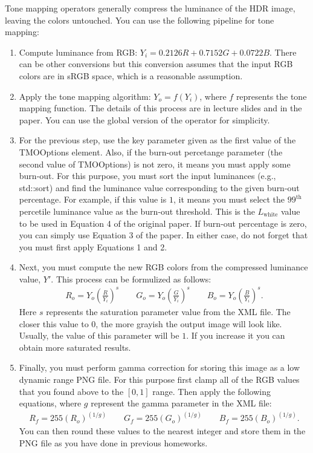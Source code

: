 \documentclass[12pt]{article}
\begin{document}
Tone mapping operators generally compress the luminance of the HDR
image, leaving the colors untouched. You can use the following pipeline
for tone mapping:

\begin{enumerate}
\item Compute luminance from RGB: $Y_i = 0.2126R + 0.7152G + 0.0722B$.
There can be other conversions but this conversion assumes that the
input RGB colors are in sRGB space, which is a reasonable assumption.
\item Apply the tone mapping algorithm: $Y_o = f(Y_i)$, where $f$
represents the tone mapping function. The details of this process are in
lecture slides and in the paper. You can use the global version of the
operator for simplicity.
\item For the previous step, use the key parameter given as the first
value of the TMOOptions element. Also, if the burn-out percetange
parameter (the second value of TMOOptions) is not zero, it means you 
must apply some burn-out. For this purpose, you must sort the input
luminances (e.g., std::sort) and find the luminance value corresponding
to the given burn-out percentage. For example, if this value is $1$, it
means you must select the $99^\mathrm{th}$ percetile luminance value as
the burn-out threshold. This is the $L_\mathrm{white}$ value to be used
in Equation 4 of the original paper. If burn-out percentage is zero, you
can simply use Equation 3 of the paper. In either case, do not forget
that you must first apply Equations 1 and 2.
\item Next, you must compute the new RGB colors from the compressed
luminance value, $Y'$. This process can be formulized as follows:
%
\begin{align}
R_o = Y_o\left(\frac{R}{Y_i}\right)^s \qquad G_o =
Y_o\left(\frac{G}{Y_i}\right)^s \qquad B_o = Y_o\left(\frac{B}{Y_i}\right)^s. 
\end{align}
%
Here $s$ represents the saturation parameter value from the XML file.
The closer this value to $0$, the more grayish the output image will
look like. Usually, the value of this parameter will be $1$. If you
increase it you can obtain more saturated results.
\item Finally, you must perform gamma correction for storing this image
as a low dynamic range PNG file. For this purpose first clamp all of the
RGB values that you found above to the $[0, 1]$ range. Then apply the
following equations, where $g$ represent the gamma parameter in the XML
file:
\begin{align}
R_f = 255 \left(R_o\right)^{(1/g)} \qquad
G_f = 255 \left(G_o\right)^{(1/g)} \qquad
B_f = 255 \left(B_o\right)^{(1/g)}.
\end{align}
%
You can then round these values to the nearest integer and store them in
the PNG file as you have done in previous homeworks.
\end{enumerate}
\end{document}
